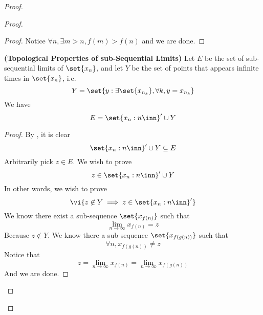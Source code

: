 \documentclass{report}
\begin{document}
\begin{proof}
\begin{proof}
\begin{proof}
Notice  $\forall n, \exists m>n, f(m)>f(n)$ and we are done.
\end{proof}
\begin{theorem}
\label{4.4.12}
\textbf{(Topological Properties of sub-Sequential Limits)} Let $E$ be the set of sub-sequential limits of $\set{x_n}$, and let $Y$ be the set of points that appears infinite times in  $\set{x_n}$, i.e.
\begin{equation*}
  Y=\set{y:\exists \set{x_{n_k}},\forall k, y=x_{n_k}}
\end{equation*}
We have
\begin{equation*}
E=\set{x_n:n\inn}' \cup Y
\end{equation*}
\end{theorem}
\begin{proof}
By , it is clear 
\begin{equation*}
\set{x_n:n\inn}' \cup Y\subseteq E
\end{equation*}
Arbitrarily pick $z\in E$. We wish to prove
\begin{equation*}
z\in \set{x_n:n\inn}'\cup Y
\end{equation*}
In other words, we wish to prove
\begin{equation*}
  \vi{z\not\in Y\implies z\in \set{x_n:n\inn}'}
\end{equation*}
We know there exist a sub-sequence $\set{x_{f(n)}}$ such that 
\begin{equation*}
\lim_{n\to\infty}x_{f(n)}=z
\end{equation*}
Because $z\not\in Y$. We know there a sub-sequence $\set{x_{f(g(n))}}$ such that
\begin{equation*}
\forall n,x_{f(g(n))}\neq z
\end{equation*}
Notice that
 \begin{equation*}
z=\lim_{n\to\infty}x_{f(n)}=\lim_{n\to\infty}x_{f(g(n))} 
\end{equation*}
And we are done.
\end{proof}
\fbox{\begin{minipage}{39em}


\end{minipage}}
\end{proof}
\end{proof}
\end{document}
